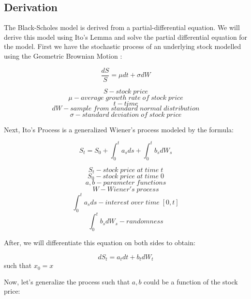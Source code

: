 


\subsection{Derivation}
The Black-Scholes model is derived from a partial-differential equation. We will derive this model using Ito's Lemma and solve the partial differential equation for the model. First we have the stochastic process of an underlying stock modelled using the Geometric Brownian Motion \cite{BSDerivation}:

\[ \frac{dS}{S} = \mu dt + \sigma dW\]


$$S - stock\; price$$
$$\mu - average\; growth\; rate\; of\; stock\; price$$
$$t - time$$
$$dW - sample\; from\; standard\; normal\; distribution$$
$$\sigma - standard\; deviation\; of\; stock\; price$$


Next, Ito's Process is a generalized Wiener's process modeled by the formula:

\[ S_t = S_0 + \int_{0}^{t}a_{s}ds + \int_{0}^{t}b_{s}dW_{s}\]


$$S_t - stock\; price\; at\; time\; t$$
$$S_0 - stock \;price\; at\; time\;0$$
$$a,b - parameter\; functions$$
$$ W - Wiener's\; process $$
$$\int_{0}^{t}a_{s}ds - interest\; over\; time\; [0,t]$$
$$\int_{0}^{t}b_{s}dW_{s} - randomness $$



After, we will differentiate this equation on both sides to obtain:

\[ dS_t = a_{t}dt + b_{t}dW_{t}\] such that $x_0 = x$

\vspace{.5mm}

Now, let's generalize the process such that $a,b$ could be a function of the stock price:

